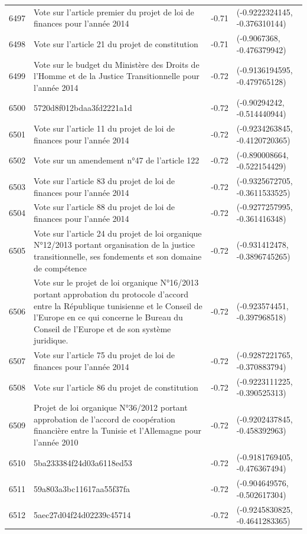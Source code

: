 \begin{table}[ht]
\begin{tabular}{rlrl}
  6497 & Vote sur l'article premier du projet de loi de finances pour l'année 2014 & -0.71 & (-0.9222324145, -0.376310144) \\ 
  6498 & Vote sur l'article 21 du projet de constitution & -0.71 & (-0.9067368, -0.476379942) \\ 
  6499 & Vote sur le budget du Ministère des Droits de l'Homme et de la Justice Transitionnelle pour l'année 2014 & -0.72 & (-0.9136194595, -0.479765128) \\ 
  6500 & 5720d8f012bdaa3fd2221a1d & -0.72 & (-0.90294242, -0.514440944) \\ 
  6501 & Vote sur l'article 11 du projet de loi de finances pour l'année 2014 & -0.72 & (-0.9234263845, -0.4120720365) \\ 
  6502 & Vote sur un amendement n°47 de l'article 122 & -0.72 & (-0.890008664, -0.522154429) \\ 
  6503 & Vote sur l'article 83 du projet de loi de finances pour l'année 2014 & -0.72 & (-0.9325672705, -0.3611533525) \\ 
  6504 & Vote sur l'article 88 du projet de loi de finances pour l'année 2014 & -0.72 & (-0.9277257995, -0.361416348) \\ 
  6505 & Vote sur l'article 24 du projet de loi organique N°12/2013 portant organisation de la justice transitionnelle, ses fondements et son domaine de compétence & -0.72 & (-0.931412478, -0.3896745265) \\ 
  6506 & Vote sur le projet de loi organique N°16/2013 portant approbation du protocole d'accord entre la République tunisienne et le Conseil de l'Europe en ce qui concerne le Bureau du Conseil de l'Europe et de son système juridique. & -0.72 & (-0.923574451, -0.397968518) \\ 
  6507 & Vote sur l'article 75 du projet de loi de finances pour l'année 2014 & -0.72 & (-0.9287221765, -0.370883794) \\ 
  6508 & Vote sur l'article 86 du projet de constitution & -0.72 & (-0.9223111225, -0.390525313) \\ 
  6509 & Projet de loi organique N°36/2012 portant approbation de l'accord de coopération financière entre la Tunisie et l'Allemagne pour l'année 2010 & -0.72 & (-0.9202437845, -0.458392963) \\ 
  6510 & 5ba233384f24d03a6118ed53 & -0.72 & (-0.9181769405, -0.476367494) \\ 
  6511 & 59a803a3bc11617aa55f37fa & -0.72 & (-0.904649576, -0.502617304) \\ 
  6512 & 5aec27d04f24d02239c45714 & -0.72 & (-0.9245830825, -0.4641283365) \\ 

\end{tabular}
\end{table}
